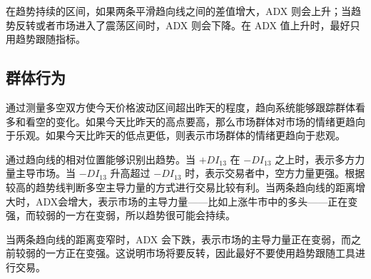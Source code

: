 
在趋势持续的区间，如果两条平滑趋向线之间的差值增大，ADX 则会上升；当趋势反转或者市场进入了震荡区间时，ADX 则会下降。在 ADX 值上升时，最好只用趋势跟随指标。
\subsection*{群体行为}
通过测量多空双方使今天价格波动区间超出昨天的程度，趋向系统能够跟踪群体看多和看空的变化。如果今天比昨天的高点要高，那么市场群体对市场的情绪更趋向于乐观。如果今天比昨天的低点更低，则表示市场群体的情绪更趋向于悲观。

通过趋向线的相对位置能够识别出趋势。当 $+DI_{13}$ 在 $-DI_{13}$ 之上时，表示多方力量主导市场。当 $-DI_{13}$ 升高超过 $-DI_{13}$ 时，表示交易者中，空方力量更强。根据较高的趋势线判断多空主导力量的方式进行交易比较有利。当两条趋向线的距离增大时，ADX会增大，表示市场的主导力量——比如上涨牛市中的多头——正在变强，而较弱的一方在变弱，所以趋势很可能会持续。

当两条趋向线的距离变窄时，ADX 会下跌，表示市场的主导力量正在变弱，而之前较弱的一方正在变强。这说明市场将要反转，因此最好不要使用趋势跟随工具进行交易。
